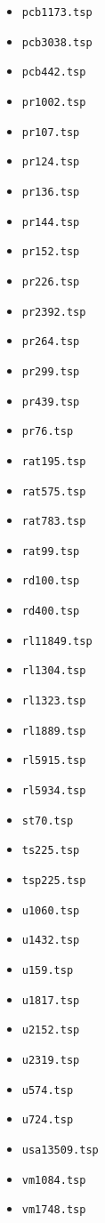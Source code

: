 \begin{appendices}
{\begin{multicols}{4}
\begin{itemize}
\item \texttt{pcb1173.tsp}
\item \texttt{pcb3038.tsp}
\item \texttt{pcb442.tsp}
\item \texttt{pr1002.tsp}
\item \texttt{pr107.tsp}
\item \texttt{pr124.tsp}
\item \texttt{pr136.tsp}
\item \texttt{pr144.tsp}
\item \texttt{pr152.tsp}
\item \texttt{pr226.tsp}
\item \texttt{pr2392.tsp}
\item \texttt{pr264.tsp}
\item \texttt{pr299.tsp}
\item \texttt{pr439.tsp}
\item \texttt{pr76.tsp}
\item \texttt{rat195.tsp}
\item \texttt{rat575.tsp}
\item \texttt{rat783.tsp}
\item \texttt{rat99.tsp}
\item \texttt{rd100.tsp}
\item \texttt{rd400.tsp}
\item \texttt{rl11849.tsp}
\item \texttt{rl1304.tsp}
\item \texttt{rl1323.tsp}
\item \texttt{rl1889.tsp}
\item \texttt{rl5915.tsp}
\item \texttt{rl5934.tsp}
\item \texttt{st70.tsp}
\item \texttt{ts225.tsp}
\item \texttt{tsp225.tsp}
\item \texttt{u1060.tsp}
\item \texttt{u1432.tsp}
\item \texttt{u159.tsp}
\item \texttt{u1817.tsp}
\item \texttt{u2152.tsp}
\item \texttt{u2319.tsp}
\item \texttt{u574.tsp}
\item \texttt{u724.tsp}
\item \texttt{usa13509.tsp}
\item \texttt{vm1084.tsp}
\item \texttt{vm1748.tsp}
    \end{itemize}
    \end{multicols}
}
\normalsize


\end{appendices}
